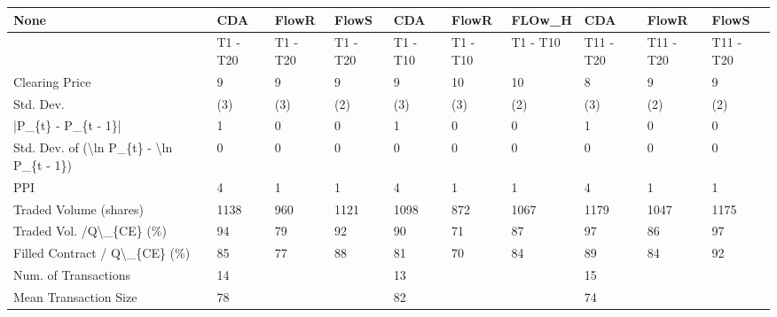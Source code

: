 \begin{tabular}{llllllllll}
\hline
 None                                                      & CDA      & FlowR    & FlowS    & CDA      & FlowR    & FLOw\_H   & CDA       & FlowR     & FlowS     \\
\hline
                                                           & T1 - T20 & T1 - T20 & T1 - T20 & T1 - T10 & T1 - T10 & T1 - T10 & T11 - T20 & T11 - T20 & T11 - T20 \\
 Clearing Price                                            & 9        & 9        & 9        & 9        & 10       & 10       & 8         & 9         & 9         \\
 Std. Dev.                                                 & (3)      & (3)      & (2)      & (3)      & (3)      & (2)      & (3)       & (2)       & (2)       \\
 |P\_\{t\} - P\_\{t - 1\}|                                       & 1        & 0        & 0        & 1        & 0        & 0        & 1         & 0         & 0         \\
 Std. Dev. of (\textbackslash{}ln P\_\{t\} - \textbackslash{}ln P\_\{t - 1\})                  & 0        & 0        & 0        & 0        & 0        & 0        & 0         & 0         & 0         \\
 PPI                                                       & 4        & 1        & 1        & 4        & 1        & 1        & 4         & 1         & 1         \\
 Traded Volume (shares)                                    & 1138     & 960      & 1121     & 1098     & 872      & 1067     & 1179      & 1047      & 1175      \\
 Traded Vol. /Q\textbackslash{}\_\{CE\} (\%)                                  & 94       & 79       & 92       & 90       & 71       & 87       & 97        & 86        & 97        \\
 Filled Contract / Q\textbackslash{}\_\{CE\} (\%)                             & 85       & 77       & 88       & 81       & 70       & 84       & 89        & 84        & 92        \\
 Num. of Transactions                                      & 14       &          &          & 13       &          &          & 15        &           &           \\
 Mean Transaction Size                                     & 78       &          &          & 82       &          &          & 74        &           &           \\

\end{tabular}
